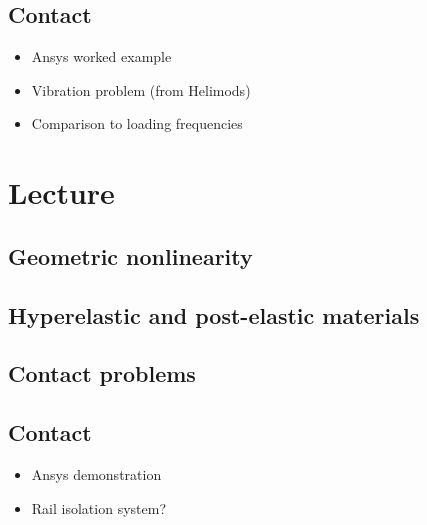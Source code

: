 \documentclass[12pt]{article}
\begin{document}
\newpage


\subsection*{Contact}
\begin{itemize}
\item Ansys worked example
\item Vibration problem (from Helimods)
\item Comparison to loading  frequencies
\end{itemize}

\section{Lecture}
\subsection{Geometric nonlinearity}
\subsection{Hyperelastic and post-elastic materials}
\subsection{Contact problems}
\subsection*{Contact}
\begin{itemize}
    \item Ansys demonstration
    \item Rail isolation system?
\end{itemize}
\end{document}

